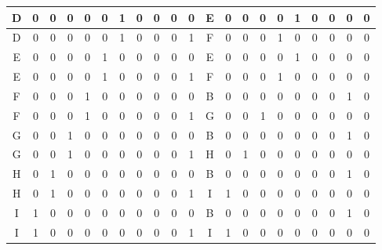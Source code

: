 \documentclass{article}
\begin{document}
\begin{table}[htbp]
{\begin{tabular}{|c|c|c|c|c|c|c|c|c|c|c|c|c|c|c|c|c|c|c|c|c|}
    \hline
    D     & 0     & 0     & 0     & 0     & 0     & 1     & 0     & 0     & 0     & 0     & E     & 0     & 0     & 0     & 0     & 1     & 0     & 0     & 0     & 0 \bigstrut\\
    \hline
    D     & 0     & 0     & 0     & 0     & 0     & 1     & 0     & 0     & 0     & 1     & F     & 0     & 0     & 0     & 1     & 0     & 0     & 0     & 0     & 0 \bigstrut\\
    \hline
    E     & 0     & 0     & 0     & 0     & 1     & 0     & 0     & 0     & 0     & 0     & E     & 0     & 0     & 0     & 0     & 1     & 0     & 0     & 0     & 0 \bigstrut\\
    \hline
    E     & 0     & 0     & 0     & 0     & 1     & 0     & 0     & 0     & 0     & 1     & F     & 0     & 0     & 0     & 1     & 0     & 0     & 0     & 0     & 0 \bigstrut\\
    \hline
    F     & 0     & 0     & 0     & 1     & 0     & 0     & 0     & 0     & 0     & 0     & B     & 0     & 0     & 0     & 0     & 0     & 0     & 0     & 1     & 0 \bigstrut\\
    \hline
    F     & 0     & 0     & 0     & 1     & 0     & 0     & 0     & 0     & 0     & 1     & G     & 0     & 0     & 1     & 0     & 0     & 0     & 0     & 0     & 0 \bigstrut\\
    \hline
    G     & 0     & 0     & 1     & 0     & 0     & 0     & 0     & 0     & 0     & 0     & B     & 0     & 0     & 0     & 0     & 0     & 0     & 0     & 1     & 0 \bigstrut\\
    \hline
    G     & 0     & 0     & 1     & 0     & 0     & 0     & 0     & 0     & 0     & 1     & H     & 0     & 1     & 0     & 0     & 0     & 0     & 0     & 0     & 0 \bigstrut\\
    \hline
    H     & 0     & 1     & 0     & 0     & 0     & 0     & 0     & 0     & 0     & 0     & B     & 0     & 0     & 0     & 0     & 0     & 0     & 0     & 1     & 0 \bigstrut\\
    \hline
    H     & 0     & 1     & 0     & 0     & 0     & 0     & 0     & 0     & 0     & 1     & I     & 1     & 0     & 0     & 0     & 0     & 0     & 0     & 0     & 0 \bigstrut\\
    \hline
    I     & 1     & 0     & 0     & 0     & 0     & 0     & 0     & 0     & 0     & 0     & B     & 0     & 0     & 0     & 0     & 0     & 0     & 0     & 1     & 0 \bigstrut\\
    \hline
    I     & 1     & 0     & 0     & 0     & 0     & 0     & 0     & 0     & 0     & 1     & I     & 1     & 0     & 0     & 0     & 0     & 0     & 0     & 0     & 0 \bigstrut\\
    \hline
    \end{tabular}}%
  \label{tab:states}%
\end{table}%
\end{document}
